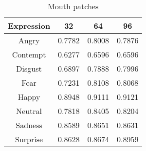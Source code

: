 \begin{table}
\caption{Mouth patches}
\label{table:mouth}

\begin{tabular}{| c | c | c | c |}
\hline
Expression & 32 &  64  & 96  \\

\hline
Angry	&	0.7782	&	0.8008	&	0.7876	\\
Contempt	&	0.6277	&	0.6596	&	0.6596	\\
Disgust	&	0.6897	&	0.7888	&	0.7996	\\
Fear	&	0.7231	&	0.8108	&	0.8068	\\
Happy	&	0.8948	&	0.9111	&	0.9121	\\
Neutral	&	0.7818	&	0.8405	&	0.8204	\\
Sadness	&	0.8589	&	0.8651	&	0.8631	\\
Surprise &	0.8628	&	0.8674	&	0.8959	\\


\hline
\end{tabular}
\end{table}